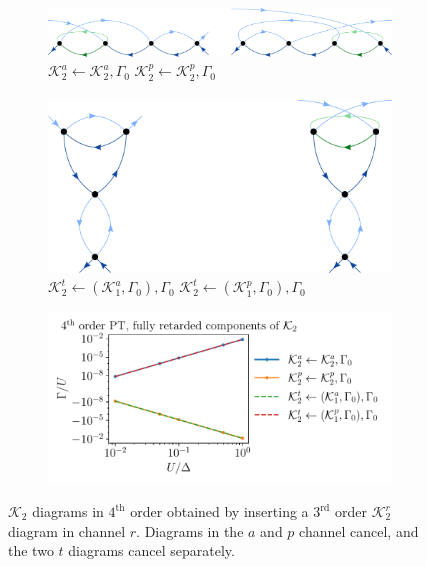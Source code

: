 \documentclass[10pt]{scrartcl}
\newcommand{\Ktot}[1]{\mathcal{K}_#1}
\newcommand{\K}[2]{\mathcal{K}_#1^#2}
\begin{document}
\newpage

\begin{figure}[h!]
\begin{subfigure}[c]{0.4\textwidth}
\includegraphics[scale=0.3]{diagrams/PT4_K2_2s_ap}
\\
\phantom{.}\hspace{0.45cm} $\K2a \leftarrow \K2a, \Gamma_0$ \hspace{1cm} $\K2p \leftarrow \K2p, \Gamma_0$
\\ \\
\phantom{.}\hspace{0.45cm}
\includegraphics[scale=0.3]{diagrams/PT4_K2_2s_t}
\\
\phantom{.}$\K2t \leftarrow (\K1a, \Gamma_0), \Gamma_0$ \hspace{0.6cm} $\K2t \leftarrow (\K1p, \Gamma_0), \Gamma_0$
\end{subfigure}
\begin{subfigure}[c]{0.4\textwidth}
\includegraphics[scale=0.65]{plots/PT4_K2_2s}
\end{subfigure}
\caption{$\Ktot2$ diagrams in $4^\text{th}$ order obtained by inserting a $3^\text{rd}$ order $\K2r$ diagram in channel $r$. Diagrams in the $a$ and $p$ channel cancel, and the two $t$ diagrams cancel separately.}
\end{figure}
\end{document}

